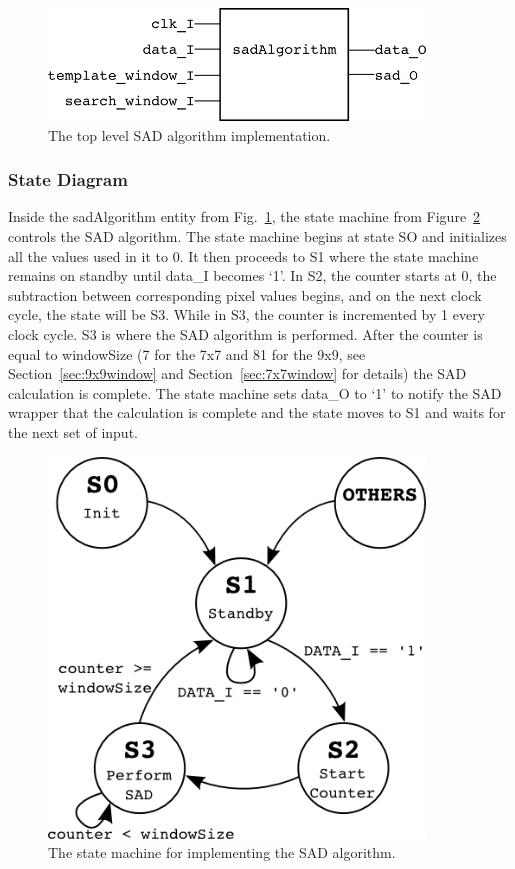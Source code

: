 \begin{figure}[h]
	\begin{center}
		\includegraphics[width=100mm]{figures/sadAlgorithm_rtl.png}
		\captionfonts
		\caption{The top level SAD algorithm implementation.}
		\label{fig:sadAlg_rtl}
	\end{center}
\end{figure}

\subsubsection{State Diagram}

Inside the sadAlgorithm entity from Fig.~\ref{fig:sadAlg_rtl}, the state machine from Figure~\ref{fig:stateMachine} controls the SAD algorithm. The state machine begins at state SO and initializes all the values used in it to 0. It then proceeds to S1 where the state machine remains on standby until data\_I becomes `1'. In S2, the counter starts at 0, the subtraction between corresponding pixel values begins, and on the next clock cycle, the state will be S3. While in S3, the counter is incremented by 1 every clock cycle. S3 is where the SAD algorithm is performed. After the counter is equal to windowSize (7 for the 7x7 and 81 for the 9x9, see Section~\ref{sec:9x9window} and Section~\ref{sec:7x7window} for details) the SAD calculation is complete. The state machine sets data\_O to `1' to notify the SAD wrapper that the calculation is complete and the state moves to S1 and waits for the next set of input.

\begin{figure}[h]
	\begin{center}
		\includegraphics[width=100mm]{figures/stateMachine.png}
		\captionfonts
		\caption{The state machine for implementing the SAD algorithm.}
		\label{fig:stateMachine}
	\end{center}
\end{figure}

